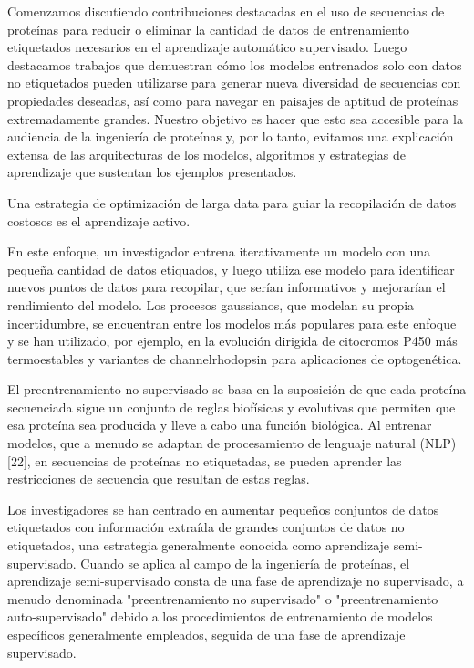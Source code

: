 \documentclass[12pt]{article}
\begin{document}
Comenzamos discutiendo contribuciones destacadas en el uso de secuencias de proteínas para reducir o eliminar la cantidad de datos de entrenamiento etiquetados necesarios en el aprendizaje automático supervisado. Luego destacamos trabajos que demuestran cómo los modelos entrenados solo con datos no etiquetados pueden utilizarse para generar nueva diversidad de secuencias con propiedades deseadas, así como para navegar en paisajes de aptitud de proteínas extremadamente grandes. Nuestro objetivo es hacer que esto sea accesible para la audiencia de la ingeniería de proteínas y, por lo tanto, evitamos una explicación extensa de las arquitecturas de los modelos, algoritmos y estrategias de aprendizaje que sustentan los ejemplos presentados.

Una estrategia de optimización de larga data para guiar la recopilación de datos costosos es el aprendizaje activo.

En este enfoque, un investigador entrena iterativamente un modelo con una pequeña cantidad de datos etiquados, y luego utiliza ese modelo para identificar nuevos puntos de datos para recopilar, que serían informativos y mejorarían el rendimiento del modelo. Los procesos gaussianos, que modelan su propia incertidumbre, se encuentran entre los modelos más populares para este enfoque y se han utilizado, por ejemplo, en la evolución dirigida de citocromos P450 más termoestables y variantes de channelrhodopsin para aplicaciones de optogenética.

El preentrenamiento no supervisado se basa en la suposición de que cada proteína secuenciada sigue un conjunto de reglas biofísicas y evolutivas que permiten que esa proteína sea producida y lleve a cabo una función biológica. Al entrenar modelos, que a menudo se adaptan de procesamiento de lenguaje natural (NLP) [22], en secuencias de proteínas no etiquetadas, se pueden aprender las restricciones de secuencia que resultan de estas reglas.

Los investigadores se han centrado en aumentar pequeños conjuntos de datos etiquetados con información extraída de grandes conjuntos de datos no etiquetados, una estrategia generalmente conocida como aprendizaje semi-supervisado. Cuando se aplica al campo de la ingeniería de proteínas, el aprendizaje semi-supervisado consta de una fase de aprendizaje no supervisado, a menudo denominada "preentrenamiento no supervisado" o "preentrenamiento auto-supervisado" debido a los procedimientos de entrenamiento de modelos específicos generalmente empleados, seguida de una fase de aprendizaje supervisado.
\end{document}
